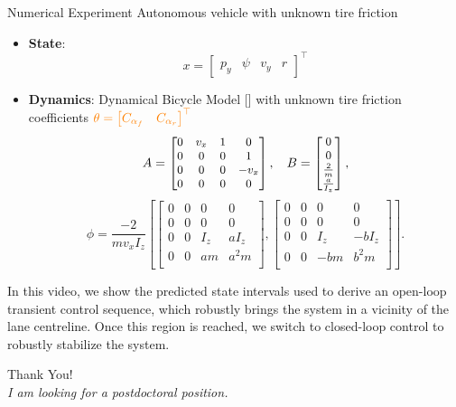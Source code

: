 \documentclass[slideopt,A4,showboxes,svgnames]{beamer}
\begin{document}
\begin{frame}{Numerical Experiment}
Autonomous vehicle with {\orange unknown tire friction}
\pause
\begin{itemize}[<+->]
	\item \textbf{State}: \useshortskip $$x = \begin{bmatrix} {p_y} & {\psi} & {v_y} & {r} \end{bmatrix}^\top $$
	\item \textbf{Dynamics}: Dynamical Bicycle Model [\cite{awan2014compensation}] with unknown tire friction coefficients ${\color{orange} \theta = \begin{bmatrix} C_{\alpha_f} & C_{\alpha_r}\end{bmatrix}^\top}$
	\useshortskip \[
	\small
	A = \begin{bmatrix}
	0 & v_x & 1 & 0 \\
	0 & 0 & 0 & 1 \\
	0 & 0 & 0 & - v_x \\
	0 & 0 & 0 & 0
	\end{bmatrix},\quad
	B =
	\begin{bmatrix}
	0 \\
	0 \\
	\frac{2}{m} \\
	\frac{a}{I_z}
	\end{bmatrix},
	\]
	\[
	\phi = \frac{-2}{m v_x I_z}\left[\begin{bmatrix}
	0 & 0 & 0 & 0 \\
	0 & 0 & 0 & 0 \\
	0 & 0 & I_z & a I_z \\
	0 & 0 & a m & a^2 m \\
	\end{bmatrix},\begin{bmatrix}
	0 & 0 & 0 & 0 \\
	0 & 0 & 0 & 0 \\
	0 & 0 & I_z & -b I_z \\
	0 & 0 & - bm & b^2 m \\
	\end{bmatrix}\right].
	\]
\end{itemize}

\end{frame}

\begin{frame}
In this video, we show the predicted state intervals used to derive an open-loop transient control sequence, which robustly brings the system in a vicinity of the lane centreline. Once this region is reached, we switch to closed-loop control to robustly stabilize the system.
\end{frame}

\begin{frame}
\centering \LARGE Thank You!\\[1cm]
\large \emph{I am looking for a postdoctoral position.}
\end{frame}
\end{document}
